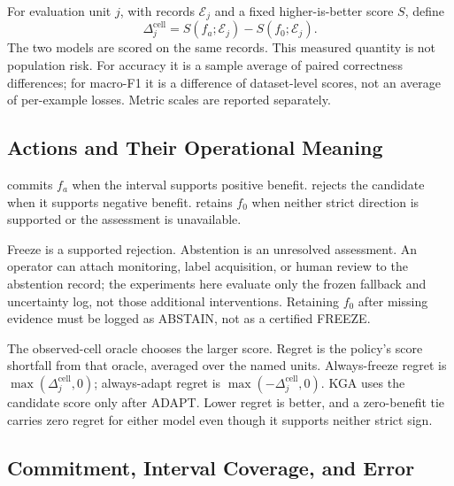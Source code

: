 For evaluation unit $j$, with records $\mathcal E_j$ and a fixed higher-is-better score $S$, define
\[
  \Delta_j^{\mathrm{cell}}=S(f_a;\mathcal E_j)-S(f_0;\mathcal E_j).
\]
The two models are scored on the same records. This measured quantity is not population risk.
For accuracy it is a sample average of paired correctness differences; for macro-F1 it is a
difference of dataset-level scores, not an average of per-example losses. Metric scales are
reported separately.

\subsection{Actions and Their Operational Meaning}

\begin{definition}
\adapt commits $f_a$ when the interval supports positive benefit.
\freeze rejects the candidate when it supports negative benefit.
\abstain retains $f_0$ when neither strict direction is supported or the assessment is unavailable.
\end{definition}

Freeze is a supported rejection. Abstention is an unresolved assessment. An operator can attach
monitoring, label acquisition, or human review to the abstention record; the experiments here
evaluate only the frozen fallback and uncertainty log, not those additional interventions.
Retaining $f_0$ after missing evidence must be logged as ABSTAIN, not as a certified FREEZE.

The observed-cell oracle chooses the larger score. Regret is the policy's score shortfall from
that oracle, averaged over the named units. Always-freeze regret is
$\max(\Delta_j^{\mathrm{cell}},0)$; always-adapt regret is
$\max(-\Delta_j^{\mathrm{cell}},0)$. KGA uses the candidate score only after ADAPT. Lower regret is
better, and a zero-benefit tie carries zero regret for either model even though it supports
neither strict sign.

\subsection{Commitment, Interval Coverage, and Error}

